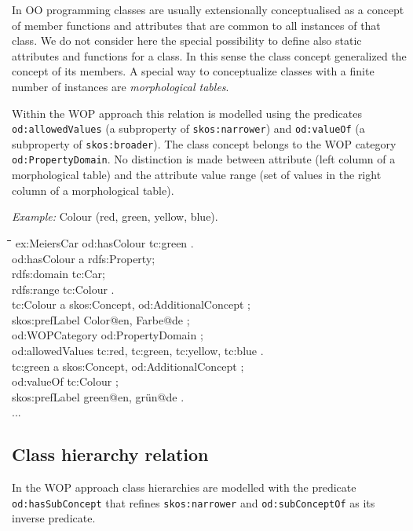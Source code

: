 \documentclass[11pt,a4paper]{article}
\newenvironment{code}{\tt \begin{tabbing}
\hskip12pt\=\hskip12pt\=\hskip12pt\=\hskip12pt\=\hskip5cm\=\hskip5cm\=\kill}
{\end{tabbing}}
\def\dq{{\char34}}
\begin{document}
In OO programming classes are usually extensionally conceptualised as a
concept of member functions and attributes that are common to all instances of
that class.  We do not consider here the special possibility to define also
static attributes and functions for a class.  In this sense the class concept
generalized the concept of its members.  A special way to conceptualize
classes with a finite number of instances are \emph{morphological tables}.

Within the WOP approach this relation is modelled using the predicates
\texttt{od:allowedValues} (a subproperty of \texttt{skos:narrower}) and
\texttt{od:valueOf} (a subproperty of \texttt{skos:broader}). The class
concept belongs to the WOP category \texttt{od:PropertyDomain}. No distinction
is made between attribute (left column of a morphological table) and the
attribute value range (set of values in the right column of a morphological
table).

\emph{Example:}  Colour (red, green, yellow, blue).

\begin{code}
  ex:MeiersCar od:hasColour tc:green . \\[4pt]
    
  od:hasColour a rdfs:Property;\\
    \>rdfs:domain tc:Car;\\
    \>rdfs:range tc:Colour .\\[4pt]

  tc:Colour a skos:Concept, od:AdditionalConcept ;\\
  \>skos:prefLabel {\dq}Color{\dq}@en, {\dq}Farbe{\dq}@de ;\\
  \>od:WOPCategory od:PropertyDomain ;\\
  \>od:allowedValues tc:red, tc:green, tc:yellow, tc:blue .\\[4pt]

  tc:green a skos:Concept, od:AdditionalConcept ;\\
  \>od:valueOf tc:Colour ; \\
  \>skos:prefLabel {\dq}green{\dq}@en, {\dq}grün{\dq}@de .\\[4pt]
  ...  
\end{code}

\subsection{Class hierarchy relation}

In the WOP approach class hierarchies are modelled with the predicate
\texttt{od:hasSubConcept} that refines \texttt{skos:narrower} and
\texttt{od:subConceptOf} as its inverse predicate.
\end{document}
